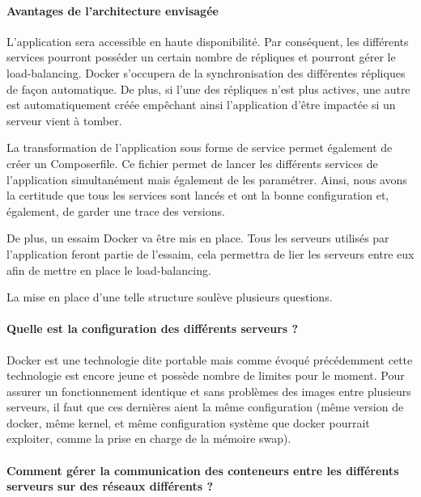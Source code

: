 \paragraph{Avantages de l'architecture envisagée}

\par L’application sera accessible en haute disponibilité. Par conséquent, les différents services pourront posséder un certain nombre de répliques et pourront gérer le load-balancing. Docker s'occupera de la synchronisation des différentes répliques de façon automatique. De plus, si l’une des répliques n’est plus actives, une autre est automatiquement créée empêchant ainsi l'application d'être impactée si un serveur vient à tomber. 

\par La transformation de l’application sous forme de service permet également de créer un Composerfile. Ce fichier permet de lancer les différents services de l’application simultanément mais également de les paramétrer. Ainsi, nous avons la certitude que tous les services sont lancés et ont la bonne configuration et, également, de garder une trace des versions.

\par De plus, un essaim Docker va être mis en place. Tous les serveurs utilisés par l’application feront partie de l’essaim, cela permettra de lier les serveurs entre eux afin de mettre en place le load-balancing.



\par La mise en place d’une telle structure soulève plusieurs questions.

\paragraph{Quelle est la configuration des différents serveurs ?} 

\par Docker est une technologie dite portable mais comme évoqué précédemment cette technologie est encore jeune et possède nombre de limites pour le moment. Pour assurer un fonctionnement identique et sans problèmes des images entre plusieurs serveurs, il faut que ces dernières aient la même configuration (même version de docker, même kernel, et même configuration système que docker pourrait exploiter, comme la prise en charge de la mémoire swap). 

\paragraph{Comment gérer la communication des conteneurs entre les différents serveurs sur des réseaux différents ?} 

